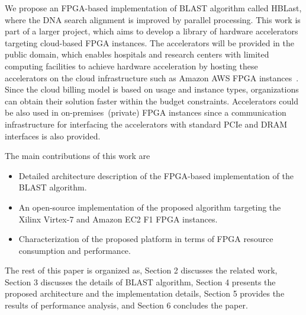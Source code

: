 We propose an FPGA-based implementation of BLAST algorithm called HBLast, where the DNA search alignment is improved by parallel processing. 
This work is part of a larger project, which aims to develop a library of hardware accelerators targeting cloud-based FPGA instances.
The accelerators will be provided in the public domain, which enables hospitals and research centers with limited computing facilities to achieve hardware acceleration by hosting these accelerators on the cloud infrastructure such as Amazon AWS FPGA instances~\cite{aws2018}.
Since the cloud billing model is based on usage and instance types, organizations can obtain their solution faster within the budget constraints.
Accelerators could be also used in on-premises~(private) FPGA instances since a communication infrastructure for interfacing the accelerators with standard PCIe and DRAM interfaces is also provided.

The main contributions of this work are
\begin{itemize}
\item Detailed architecture description of the FPGA-based implementation of the BLAST algorithm.
\item An open-source implementation of the proposed algorithm targeting the Xilinx Virtex-7 and Amazon EC2 F1 FPGA instances.
\item Characterization of the proposed platform in terms of FPGA resource consumption and performance.
\end{itemize}

The rest of this paper is organized as, Section 2 discusses the related work, Section 3 discusses the details of BLAST algorithm, Section 4 presents the proposed architecture and the implementation details, Section 5 provides the results of performance analysis, and Section 6 concludes the paper.